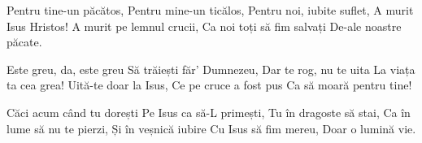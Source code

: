 \beginverse
Pentru tine-un păcătos,
Pentru mine-un ticălos,
Pentru noi, iubite suflet,
A murit Isus Hristos!
A murit pe lemnul crucii,
Ca noi toți să fim salvați
De-ale noastre păcate.
\endverse

\beginchorus
Este greu, da, este greu
Să trăiești făr’ Dumnezeu,
Dar te rog, nu te uita
La viața ta cea grea!
Uită-te doar la Isus,
Ce pe cruce a fost pus
Ca să moară pentru tine!
\endchorus

\beginverse
Căci acum când tu dorești
Pe Isus ca să-L primești,
Tu în dragoste să stai,
Ca în lume să nu te pierzi,
Și în veșnică iubire
Cu Isus să fim mereu,
Doar o lumină vie.
\endverse
\endsong